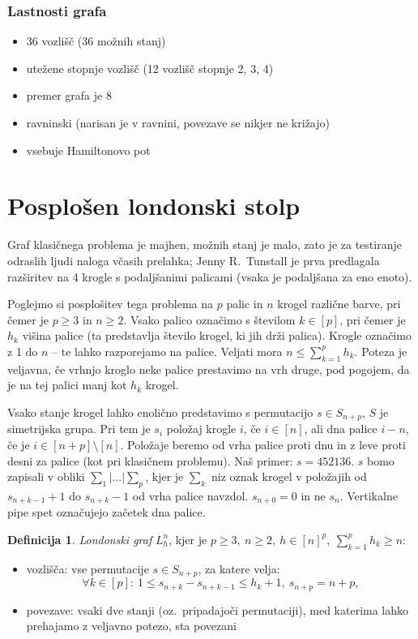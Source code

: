 \documentclass[11pt]{article}
\theoremstyle{definition} %
\newtheorem{definicija}{Definicija}[section]
\theoremstyle{plain} %
\begin{document}
\subsubsection{Lastnosti grafa}
\begin{itemize}
    \item 36 vozlišč (36 možnih stanj)
    \item utežene stopnje vozlišč (12 vozlišč stopnje 2, 3, 4)
    \item premer grafa je 8
    \item ravninski (narisan je v ravnini, povezave se nikjer ne križajo)
    \item vsebuje Hamiltonovo pot
\end{itemize}


\section{Posplošen londonski stolp}
Graf klasičnega problema je majhen, možnih stanj je malo, zato je za testiranje odraslih ljudi naloga včasih prelahka; Jenny R.\ Tunstall je prva predlagala razširitev na 4 krogle s podaljšanimi palicami (vsaka je podaljšana za eno enoto).

Poglejmo si posplošitev tega problema na $p$ palic in $n$ krogel različne barve, pri čemer je $p \geq 3 \text{ in } n \geq 2$. Vsako palico označimo s številom $k \in [p]$, pri čemer je $h_k$ višina palice (ta predstavlja število krogel, ki jih drži palica). Krogle označimo z 1 do $n$ -- te lahko razporejamo na palice. Veljati mora $n \leq \sum_{k=1}^p h_k$. Poteza je veljavna, če vrhnjo kroglo neke palice prestavimo na vrh druge, pod pogojem, da je na tej palici manj kot $h_k$ krogel.

Vsako stanje krogel lahko enolično predstavimo s permutacijo $s \in S_{n+p}$, $S$ je simetrijska grupa. Pri tem je $s_i$ položaj krogle $i$, če $i \in [n] $, ali dna palice $i-n$, če je $i \in [n+p] \setminus [n] $. Položaje beremo od vrha palice proti dnu in z leve proti desni za palice (kot pri klasičnem problemu).
Naš primer: $s = 452136$.
{\small $s$ bomo zapisali v obliki $ \sum_1 | \ldots | \sum_p $, kjer je $\sum_k$ niz oznak krogel v položajih od $s_{n+k-1} + 1$ do $s_{n+k}-1$ od vrha palice navzdol. $s_{n+0} = 0$ in ne $s_n$. Vertikalne pipe spet označujejo začetek dna palice.}

\begin{definicija}
    \emph{Londonski graf} $L_h^n$, kjer je $p \geq 3,\ n \geq 2,\ h \in [n]^p,\  \sum_{k=1}^p h_k \geq n$:
    \begin{itemize}
        \item vozlišča: vse permutacije $s \in S_{n+p}$, za katere velja:
        \[\forall k \in [p]:\ 1 \leq s_{n+k} - s_{n+k-1} \leq h_k + 1,\ s_{n+p} = n + p ,\]
        \item povezave: vsaki dve stanji (oz.\ pripadajoči permutaciji), med katerima lahko prehajamo z veljavno potezo, sta povezani
    \end{itemize}
\end{definicija}
\end{document}
